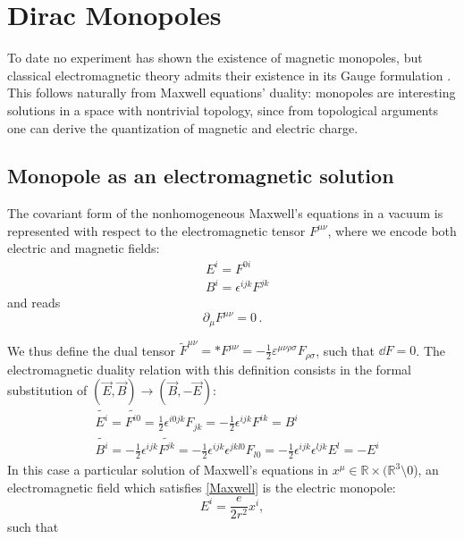 \section{Dirac Monopoles}

To date no experiment has shown the existence of magnetic monopoles, but classical electromagnetic theory admits their existence in its Gauge formulation \cite{Dirac}.
This follows naturally from Maxwell equations' duality: monopoles are interesting solutions in a space with nontrivial topology, since from topological arguments one can derive the quantization of magnetic and electric charge.

\subsection{Monopole as an electromagnetic solution}

The covariant form of the nonhomogeneous Maxwell's equations in a vacuum is represented with respect to the electromagnetic tensor $F^{\mu \nu}$, where we encode both electric and magnetic fields:
%
\begin{align}
&E^i=F^{0i}\\
&B^i=\epsilon^{ijk}F^{jk}
\end{align}
%
and reads
%
\begin{equation}\label{Maxwell}
\partial_{\mu}F^{\mu \nu}=0\,.
\end{equation}

We thus define the dual tensor
$\tilde{F}^{\mu\nu}=*F^{\mu\nu}=-\frac{1}{2}\varepsilon^{\mu \nu \rho \sigma}F_{\rho \sigma}$,
such that $\dd{F}=0$.
The electromagnetic duality relation with this definition consists in the formal substitution of $(\vec E,\vec B)\to(\vec B,-\vec E)$:
%
\begin{align}
&\tilde{E^i}=\tilde{F^{i0}}=\frac{1}{2}\epsilon^{i0jk}F_{jk}=-\frac{1}{2}\epsilon^{ijk}F^{ik}=B^i\\
&\tilde{B^i}=-\frac{1}{2}\epsilon^{ijk}\tilde{F^{jk}}=-\frac{1}{2}\epsilon^{ijk}\epsilon^{jkl0}F_{l0}=-\frac{1}{2}\epsilon^{ijk}\epsilon^{ljk}E^l=-E^i
\end{align}
%
In this case a particular solution of Maxwell's equations in $x^\mu \in \mathbb R \times (\mathbb{R}^3 \setminus \qty{0}$), \ie an electromagnetic field which satisfies \eqref{Maxwell} is the electric monopole:
%
\begin{equation}\label{ElectricMonopole}
E^i=\frac{e}{2r^2}x^i,
\end{equation}
such that


